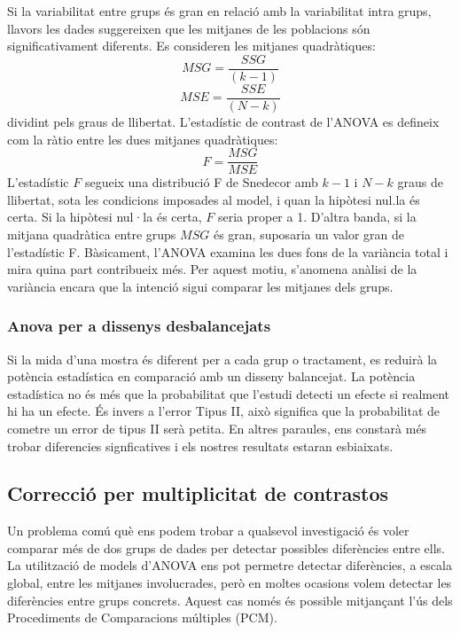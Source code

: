 \documentclass[english]{article}
\begin{document}
Si la variabilitat entre grups és gran en relació amb la variabilitat intra grups, llavors les dades suggereixen que les mitjanes de les poblacions són significativament diferents. Es consideren les mitjanes quadràtiques:
\begin{equation*}
MSG = \frac{SSG}{(k-1)}
\end{equation*}
\begin{equation*}
MSE = \frac{SSE}{(N-k)}
\end{equation*}
dividint pels graus de llibertat. L'estadístic de contrast de l'ANOVA es defineix com la ràtio entre les dues mitjanes quadràtiques:
\begin{equation*}
F = \frac{MSG}{MSE}
\end{equation*}
L'estadístic $F$ segueix una distribució F de Snedecor amb $k-1$ i $N-k$ graus de llibertat, sota les condicions imposades al model, i quan la hipòtesi nul.la és certa. Si la hipòtesi nul·la és certa, $F$ seria proper a 1. D'altra banda, si la mitjana quadràtica entre grups $MSG$ és gran, suposaria un valor gran de l'estadístic F. Bàsicament, l'ANOVA examina les dues fons de la variància total i mira quina part contribueix més. Per aquest motiu, s'anomena anàlisi de la variància encara que la intenció sigui comparar les mitjanes dels grups.
\\

\subsubsection{Anova per a dissenys desbalancejats}
Si la mida d'una mostra és diferent per a cada grup o tractament, es reduirà la potència estadística en comparació amb un disseny balancejat. La potència estadística no és més que la probabilitat que l'estudi detecti un efecte si realment hi ha un efecte. És invers a l'error Tipus II, això significa que la probabilitat de cometre un error de tipus II serà petita. En altres paraules, ens constarà més trobar diferencies signficatives i els nostres resultats estaran esbiaixats.
\clearpage
\subsection{Correcció per multiplicitat de contrastos}
\label{2.2}
Un problema comú què ens podem trobar a qualsevol investigació és voler comparar més de dos grups de dades per detectar possibles diferències entre ells. La utilització de models d'ANOVA ens pot permetre detectar diferències, a escala global, entre les mitjanes involucrades, però en moltes ocasions volem detectar les diferències entre grups concrets. Aquest cas només és possible mitjançant l'ús dels Procediments de Comparacions múltiples (PCM).
\\
\end{document}
